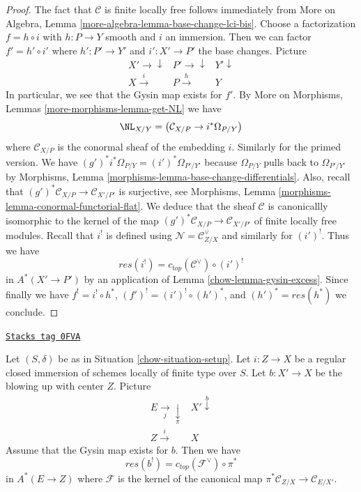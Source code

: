 \begin{proof}

The fact that $\mathcal{C}$ is finite locally free follows immediately
from More on Algebra, Lemma \ref{more-algebra-lemma-base-change-lci-bis}.
Choose a factorization $f = h \circ i$ with $h : P \to Y$ smooth and $i$
an immersion. Then we can factor $f' = h' \circ i'$ where $h' : P' \to Y'$
and $i' : X' \to P'$ the base changes. Picture
$$
\begin{array}{ccc}X' \longrightarrow\downarrow & P' \longrightarrow\downarrow & Y' \downarrow \\ X \overset{i}{\longrightarrow} & P \overset{h}{\longrightarrow} & Y\end{array}
$$
In particular, we see that the Gysin map exists for $f'$. By
More on Morphisms, Lemmas \ref{more-morphisms-lemma-get-NL}
we have
$$
\NL_{X/Y} = \left( \mathcal{C}_{X/P} \to i^*\Omega_{P/Y} \right)
$$
where $\mathcal{C}_{X/P}$ is the conormal sheaf of the embedding $i$.
Similarly for the primed version. We have
$(g')^*i^*\Omega_{P/Y} = (i')^*\Omega_{P'/Y'}$ because
$\Omega_{P/Y}$ pulls back to $\Omega_{P'/Y'}$ by
Morphisms, Lemma \ref{morphisms-lemma-base-change-differentials}.
Also, recall that $(g')^*\mathcal{C}_{X/P} \to \mathcal{C}_{X'/P'}$
is surjective, see
Morphisms, Lemma \ref{morphisms-lemma-conormal-functorial-flat}.
We deduce that the sheaf $\mathcal{C}$ is canonicallly
isomorphic to the kernel of the map
$(g')^*\mathcal{C}_{X/P} \to \mathcal{C}_{X'/P'}$
of finite locally free modules. Recall that $i^!$ is defined
using $\mathcal{N} = \mathcal{C}_{Z/X}^\vee$ and similarly
for $(i')^!$. Thus we have
$$
res(i^!) = c_{top}(\mathcal{C}^\vee) \circ (i')^!
$$
in $A^*(X' \to P')$ by an application of Lemma \ref{chow-lemma-gysin-excess}.
Since finally we have $f^! = i^! \circ h^*$,
$(f')^! = (i')^! \circ (h')^*$, and $(h')^* = res(h^*)$ we conclude.
\end{proof}

\begin{lemma}

\label{chow-lemma-blow-up-formula}
\href{https://stacks.math.columbia.edu/tag/0FVA}{\texttt{Stacks tag 0FVA}}

Let $(S, \delta)$ be as in Situation \ref{chow-situation-setup}.
Let $i : Z \to X$ be a regular closed immersion of schemes
locally of finite type over $S$. Let $b : X' \to X$ be the
blowing up with center $Z$. Picture
$$
\begin{array}{cc}E \underset{j}{\longrightarrow}\underset{\pi}{\downarrow} & X' \overset{b}{\downarrow} \\ Z \overset{i}{\longrightarrow} & X\end{array}
$$
Assume that the Gysin map exists for $b$. Then we have
$$
res(b^!) = c_{top}(\mathcal{F}^\vee) \circ \pi^*
$$
in $A^*(E \to Z)$ where $\mathcal{F}$ is the kernel of the canonical map
$\pi^*\mathcal{C}_{Z/X} \to \mathcal{C}_{E/X'}$.
\end{lemma}

